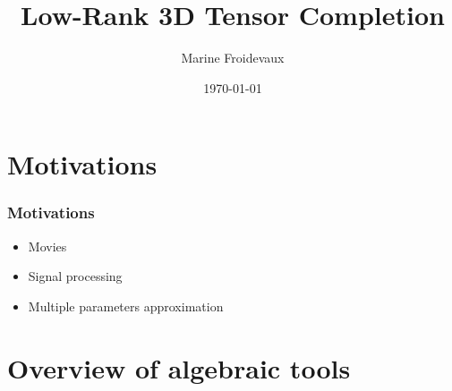 \documentclass{beamer}
\title[Low-Rank Tensor Completion]{Low-Rank 3D Tensor Completion} %
\author{Marine Froidevaux} %
\institute[EPFL] %
{
\'Ecole Polytechnique F\'ed\'erale de Lausanne \\ %
\medskip
\textit{marine.froidevaux@epfl.ch} %
}
\date{\today} %
\begin{document}
\begin{frame}
\titlepage %
\end{frame}



\section{Motivations} %


\begin{frame}
\frametitle{Motivations}
\begin{itemize}
\item Movies
\item Signal processing
\item Multiple parameters approximation
\end{itemize}
\end{frame}

\section{Overview of algebraic tools} %
\end{document}
